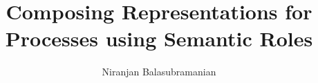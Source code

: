 \documentclass[11pt,onecolumn]{article}
\begin{document}

\title{Composing Representations for Processes using Semantic Roles}
\author{Niranjan Balasubramanian}
\maketitle
\newpage
\thispagestyle{empty}
\newpage
\tableofcontents    %
\thispagestyle{empty}
\setcounter{section}{0}
\setcounter{page}{0}
\newpage
%
\setcounter{page}{1}





%
%
%

 
{\small


}
\end{document}
